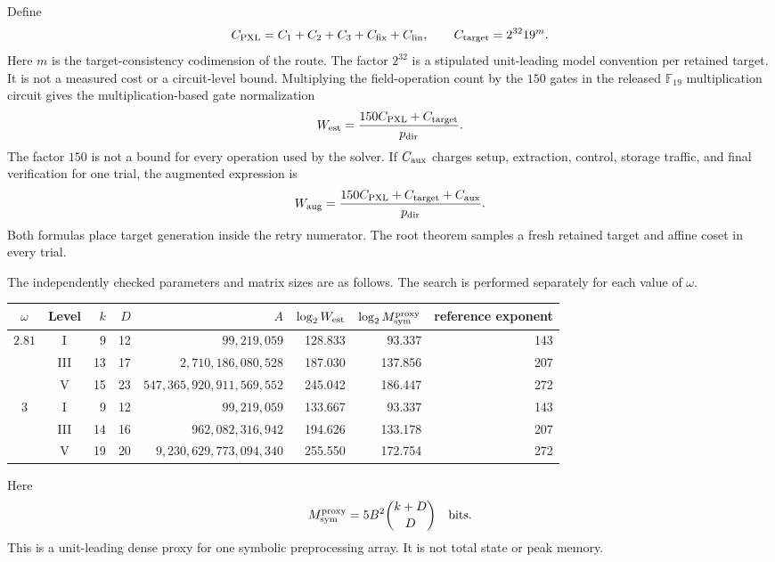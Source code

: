 \documentclass[11pt]{article}
\newcommand{\F}{\mathbb F}
\begin{document}
Define
\begin{equation}
 C_{\rm PXL}=C_1+C_2+C_3+C_{\rm fix}+C_{\rm lin},
 \qquad C_{\rm target}=2^{32}19^m.                  \label{eq:pxl-kernel-cost}
\end{equation}
Here $m$ is the target-consistency codimension of the route.  The factor
$2^{32}$ is a stipulated unit-leading model convention per retained target.
It is not a measured cost or a circuit-level bound.
Multiplying the field-operation count by the $150$ gates in the released
$\F_{19}$ multiplication circuit gives the multiplication-based gate
normalization
\begin{equation}
 W_{\rm est}=\frac{150C_{\rm PXL}+C_{\rm target}}{p_{\rm dir}}.
                                                               \label{eq:pxl-estimated-work}
\end{equation}
The factor $150$ is not a bound for every operation used by the solver.  If
$C_{\rm aux}$ charges setup,
extraction, control, storage traffic, and final verification for one trial,
the augmented expression is
\begin{equation}
 W_{\rm aug}
 =\frac{150C_{\rm PXL}+C_{\rm target}+C_{\rm aux}}{p_{\rm dir}}.
                                                               \label{eq:pxl-augmented-work}
\end{equation}
Both formulas place target generation inside the retry numerator.  The root
theorem samples a fresh retained target and affine coset in every trial.

The independently checked parameters and matrix sizes are as follows.  The
search is performed separately for each value of $\omega$.
\begin{center}
\scriptsize
\setlength{\tabcolsep}{4pt}
\begin{tabular}{@{}c c r r r r r r@{}}
\toprule
$\omega$ & Level & $k$ & $D$ & $A$ & $\log_2 W_{\rm est}$
& $\log_2 M_{\rm sym}^{\rm proxy}$ & reference exponent\\
\midrule
$2.81$ & I   & 9  & 12 & $99{,}219{,}059$ & 128.833 & 93.337 & 143\\
       & III & 13 & 17 & $2{,}710{,}186{,}080{,}528$ & 187.030 & 137.856 & 207\\
       & V   & 15 & 23 & $547{,}365{,}920{,}911{,}569{,}552$ & 245.042 & 186.447 & 272\\
\midrule
$3$    & I   & 9  & 12 & $99{,}219{,}059$ & 133.667 & 93.337 & 143\\
       & III & 14 & 16 & $962{,}082{,}316{,}942$ & 194.626 & 133.178 & 207\\
       & V   & 19 & 20 & $9{,}230{,}629{,}773{,}094{,}340$ & 255.550 & 172.754 & 272\\
\bottomrule
\end{tabular}
\end{center}
Here
\begin{equation}
 M_{\rm sym}^{\rm proxy}=5B^2\binom{k+D}{D}\quad\text{bits}.  \label{eq:pxl-storage}
\end{equation}
This is a unit-leading dense proxy for one symbolic preprocessing array.  It
is not total state or peak memory.
\end{document}
